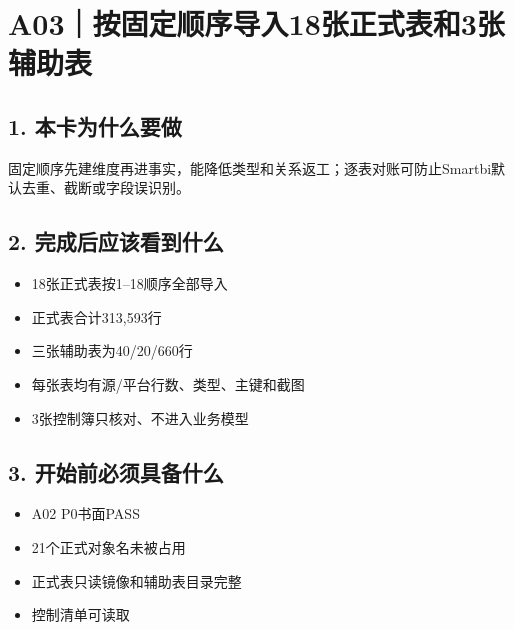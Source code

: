 \documentclass[UTF8,openany,zihao=-4]{ctexbook}
\renewcommand{\_}{\textunderscore\allowbreak}
\begin{document}
\clearpage
\section{A03｜按固定顺序导入18张正式表和3张辅助表}
\subsection*{1. 本卡为什么要做}
固定顺序先建维度再进事实，能降低类型和关系返工；逐表对账可防止Smartbi默认去重、截断或字段误识别。


\subsection*{2. 完成后应该看到什么}
\begin{itemize}
\item 18张正式表按1--18顺序全部导入
\item 正式表合计313,593行
\item 三张辅助表为40/20/660行
\item 每张表均有源/平台行数、类型、主键和截图
\item 3张控制簿只核对、不进入业务模型
\end{itemize}

\subsection*{3. 开始前必须具备什么}
\begin{itemize}[label=$\square$]
\item A02 P0书面PASS
\item 21个正式对象名未被占用
\item 正式表只读镜像和辅助表目录完整
\item 控制清单可读取
\end{itemize}
\end{document}
